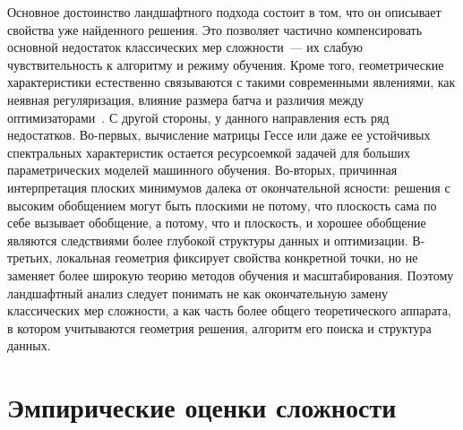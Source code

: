 Основное достоинство ландшафтного подхода состоит в том, что он описывает свойства уже найденного решения.
Это позволяет частично компенсировать основной недостаток классических мер сложности~--- их слабую чувствительность к алгоритму и режиму обучения.
Кроме того, геометрические характеристики естественно связываются с такими современными явлениями, как неявная регуляризация, влияние размера батча и различия между оптимизаторами~\cite{bousquet2002stability,hardt2016train}.
С другой стороны, у данного направления есть ряд недостатков.
Во-первых, вычисление матрицы Гессе или даже ее устойчивых спектральных характеристик остается ресурсоемкой задачей для больших параметрических моделей машинного обучения.
Во-вторых, причинная интерпретация плоских минимумов далека от окончательной ясности: решения с высоким обобщением могут быть плоскими не потому, что плоскость сама по себе вызывает обобщение, а потому, что и плоскость, и хорошее обобщение являются следствиями более глубокой структуры данных и оптимизации.
В-третьих, локальная геометрия фиксирует свойства конкретной точки, но не заменяет более широкую теорию методов обучения и масштабирования.
Поэтому ландшафтный анализ следует понимать не как окончательную замену классических мер сложности, а как часть более общего теоретического аппарата, в котором учитываются геометрия решения, алгоритм его поиска и структура данных.

\section{Эмпирические оценки сложности}

